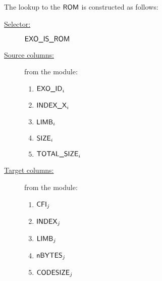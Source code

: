 The lookup to the $\textsf{ROM}$ is constructed as follows:
\begin{description}
	\item[\underline{Selector:}] $\textsf{EXO\_IS\_ROM}$
	\item[\underline{Source columns:}] from the \mmioMod{} module:
		\begin{multicols}{3}
			\begin{enumerate}
				\item $\textsf{EXO\_ID}_{i}$
				\item $\textsf{INDEX\_X}_{i}$
				\item $\textsf{LIMB}_{i}$
				\item $\textsf{SIZE}_{i}$
				\item $\textsf{TOTAL\_SIZE}_{i}$
			\end{enumerate}
		\end{multicols}
	\item[\underline{Target columns:}] from the \romMod{} module: 
		\begin{multicols}{3}
			\begin{enumerate}
				\item $\textsf{CFI}_{j}$
				\item $\textsf{INDEX}_{j}$
				\item $\textsf{LIMB}_{j}$
				\item $\textsf{nBYTES}_{j}$
				\item $\textsf{CODESIZE}_{j}$
			\end{enumerate}
		\end{multicols}
\end{description}
